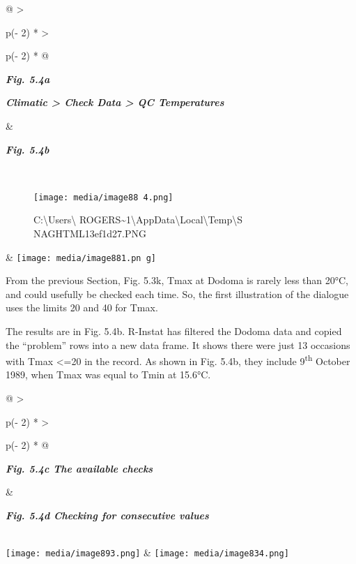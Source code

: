 \documentclass[
  letterpaper,
  DIV=11,
  numbers=noendperiod]{scrreprt}
\begin{document}
\begin{longtable}[]{@{}
  >{\raggedright\arraybackslash}p{(\columnwidth - 2\tabcolsep) * }
  >{\raggedright\arraybackslash}p{(\columnwidth - 2\tabcolsep) * }@{}}
\toprule\noalign{}
\begin{minipage}[b]{\linewidth}\raggedright
\textbf{\emph{Fig. 5.4a}}

\textbf{\emph{Climatic \textgreater{} Check Data \textgreater{} QC
Temperatures}}
\end{minipage} & \begin{minipage}[b]{\linewidth}\raggedright
\textbf{\emph{Fig. 5.4b}}
\end{minipage} \\
\midrule\noalign{}
\endhead
\bottomrule\noalign{}
\endlastfoot
\begin{minipage}[t]{\linewidth}\raggedright
\begin{figure}[H]

{\centering \texttt{[image: media/image88 4.png]}

}

\caption{C:\textbackslash Users\textbackslash{}
ROGERS\textasciitilde1\textbackslash AppData\textbackslash Local\textbackslash Temp\textbackslash S
NAGHTML13ef1d27.PNG}

\end{figure}%
\end{minipage} &
\texttt{[image: media/image881.pn g]} \\
\end{longtable}

From the previous Section, Fig. 5.3k, Tmax at Dodoma is rarely less than
20°C, and could usefully be checked each time. So, the first
illustration of the dialogue uses the limits 20 and 40 for Tmax.

The results are in Fig. 5.4b. R-Instat has filtered the Dodoma data and
copied the ``problem'' rows into a new data frame. It shows there were
just 13 occasions with Tmax \textless=20 in the record. As shown in Fig.
5.4b, they include 9\textsuperscript{th} October 1989, when Tmax was
equal to Tmin at 15.6°C.

\begin{longtable}[]{@{}
  >{\raggedright\arraybackslash}p{(\columnwidth - 2\tabcolsep) * }
  >{\raggedright\arraybackslash}p{(\columnwidth - 2\tabcolsep) * }@{}}
\toprule\noalign{}
\begin{minipage}[b]{\linewidth}\raggedright
\textbf{\emph{Fig. 5.4c The available checks}}
\end{minipage} & \begin{minipage}[b]{\linewidth}\raggedright
\textbf{\emph{Fig. 5.4d Checking for consecutive values}}
\end{minipage} \\
\midrule\noalign{}
\endhead
\bottomrule\noalign{}
\endlastfoot
\texttt{[image: media/image893.png]} &
\texttt{[image: media/image834.png]} \\
\end{longtable}
\end{document}
